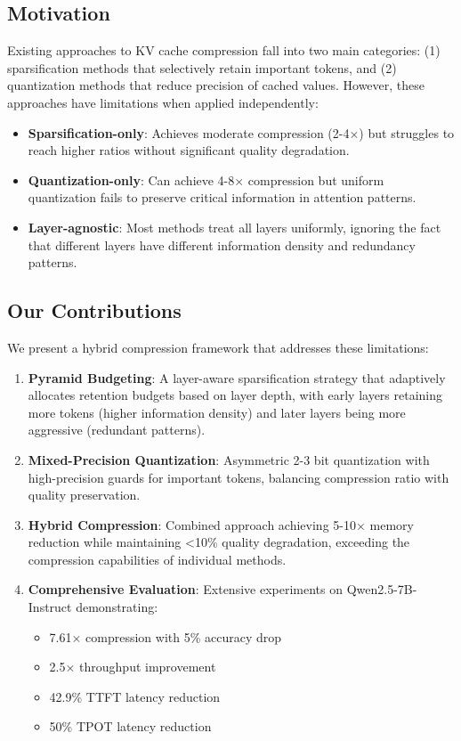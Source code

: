 \documentclass{article}
\begin{document}
\subsection{Motivation}

Existing approaches to KV cache compression fall into two main categories: (1) sparsification methods that selectively retain important tokens, and (2) quantization methods that reduce precision of cached values. However, these approaches have limitations when applied independently:

\begin{itemize}
\item \textbf{Sparsification-only}: Achieves moderate compression (2-4$\times$) but struggles to reach higher ratios without significant quality degradation.
\item \textbf{Quantization-only}: Can achieve 4-8$\times$ compression but uniform quantization fails to preserve critical information in attention patterns.
\item \textbf{Layer-agnostic}: Most methods treat all layers uniformly, ignoring the fact that different layers have different information density and redundancy patterns.
\end{itemize}

\subsection{Our Contributions}

We present a hybrid compression framework that addresses these limitations:

\begin{enumerate}
\item \textbf{Pyramid Budgeting}: A layer-aware sparsification strategy that adaptively allocates retention budgets based on layer depth, with early layers retaining more tokens (higher information density) and later layers being more aggressive (redundant patterns).

\item \textbf{Mixed-Precision Quantization}: Asymmetric 2-3 bit quantization with high-precision guards for important tokens, balancing compression ratio with quality preservation.

\item \textbf{Hybrid Compression}: Combined approach achieving 5-10$\times$ memory reduction while maintaining <10\% quality degradation, exceeding the compression capabilities of individual methods.

\item \textbf{Comprehensive Evaluation}: Extensive experiments on Qwen2.5-7B-Instruct demonstrating:
  \begin{itemize}
  \item 7.61$\times$ compression with 5\% accuracy drop
  \item 2.5$\times$ throughput improvement
  \item 42.9\% TTFT latency reduction
  \item 50\% TPOT latency reduction
  \end{itemize}
\end{enumerate}
\end{document}
